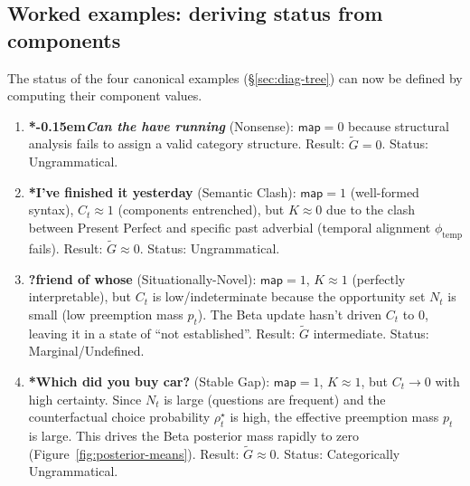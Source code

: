 \documentclass[12pt,letterpaper]{article}
\newcommand{\mention}[1]{\textit{#1}}
\newcommand{\judgesep}{\kern-0.15em}
\newcommand{\ungram}[1]{*\judgesep#1}
\begin{document}
\subsection{Worked examples: deriving status from components}
\label{sec:worked-examples}

The status of the four canonical examples (\S\ref{sec:diag-tree}) can now be defined by computing their component values.

\begin{enumerate}
   \item \textbf{\ungram{\mention{Can the have running}}} (Nonsense): 
   $\mathsf{map}=0$ because structural analysis fails to assign a valid category structure. 
   Result: $\widetilde{G} = 0$. Status: Ungrammatical.
   
   \item \textbf{*I've finished it yesterday} (Semantic Clash): 
   $\mathsf{map}=1$ (well-formed syntax), $C_t \approx 1$ (components entrenched), but $K \approx 0$ due to the clash between Present Perfect and specific past adverbial (temporal alignment $\phi_{\text{temp}}$ fails). 
   Result: $\widetilde{G} \approx 0$. Status: Ungrammatical.
   
   \item \textbf{?friend of whose} (Situationally-Novel): 
   $\mathsf{map}=1$, $K \approx 1$ (perfectly interpretable), but $C_t$ is low/indeterminate because the opportunity set $N_t$ is small (low preemption mass $p_t$). The Beta update hasn't driven $C_t$ to 0, leaving it in a state of \enquote{not established}. 
   Result: $\widetilde{G}$ intermediate. Status: Marginal/Undefined.
   
   \item \textbf{*Which did you buy car?} (Stable Gap): 
   $\mathsf{map}=1$, $K \approx 1$, but $C_t \to 0$ with high certainty. Since $N_t$ is large (questions are frequent) and the counterfactual choice probability $\rho_t^\star$ is high, the effective preemption mass $p_t$ is large. This drives the Beta posterior mass rapidly to zero (Figure~\ref{fig:posterior-means}).
   Result: $\widetilde{G} \approx 0$. Status: Categorically Ungrammatical.
\end{enumerate}
\end{document}
